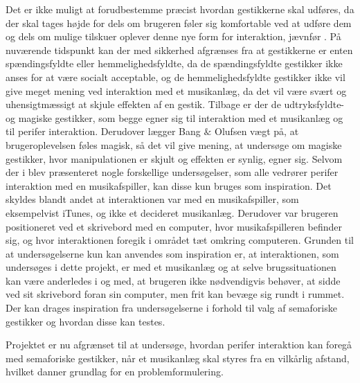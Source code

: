 Det er ikke muligt at forudbestemme præcist hvordan gestikkerne skal udføres, da der skal tages højde for dels om brugeren føler sig komfortable ved at udføre dem og dels om mulige tilskuer oplever denne nye form for interaktion, jævnfør . På nuværende tidspunkt kan der med sikkerhed afgrænses fra at gestikkerne er enten spændingsfyldte eller hemmelighedsfyldte, da de spændingsfyldte gestikker ikke anses for at være socialt acceptable, \parencite[s. 277]{PDF:WouldYouDoThat} og de hemmelighedsfyldte gestikker ikke vil give meget mening ved interaktion med et musikanlæg, da det vil være svært og uhensigtmæssigt at skjule effekten af en gestik. Tilbage er der de udtryksfyldte- og magiske gestikker, som begge egner sig til interaktion med et musikanlæg og til perifer interaktion. Derudover lægger Bang $\&$ Olufsen vægt på, at brugeroplevelsen føles magisk, så det vil give mening, at undersøge om magiske gestikker, hvor manipulationen er skjult og effekten er synlig, egner sig. \blankline
%
Selvom der i  blev præsenteret nogle forskellige undersøgelser, som alle vedrører perifer interaktion med en musikafspiller, kan disse kun bruges som inspiration. Det skyldes blandt andet at interaktionen var med en musikafspiller, som eksempelvist iTunes, og ikke et decideret musikanlæg. Derudover var brugeren positioneret ved et skrivebord med en computer, hvor musikafspilleren befinder sig, og hvor interaktionen foregik i området tæt omkring computeren. Grunden til at undersøgelserne kun kan anvendes som inspiration er, at interaktionen, som undersøges i dette projekt, er med et musikanlæg og at selve brugssituationen kan være anderledes i og med, at brugeren ikke nødvendigvis behøver, at sidde ved sit skrivebord foran sin computer, men frit kan bevæge sig rundt i rummet. Der kan drages inspiration fra undersøgelserne i forhold til valg af semaforiske gestikker og hvordan disse kan testes.                

Projektet er nu afgrænset til at undersøge, hvordan perifer interaktion kan foregå med semaforiske gestikker, når et musikanlæg skal styres fra en vilkårlig afstand, hvilket danner grundlag for en problemformulering.
